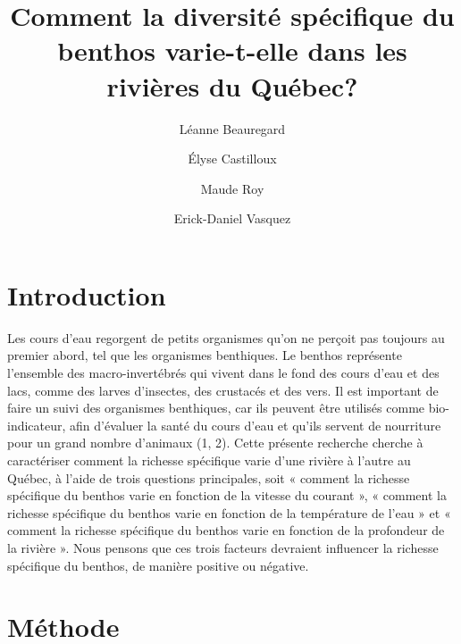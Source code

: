 \documentclass[9pt,twocolumn,twoside,final]{pnas-new}
\title{Comment la diversité spécifique du benthos varie-t-elle dans les
rivières du Québec?}
\author[a]{Léanne Beauregard}
\author[a]{Élyse Castilloux}
\author[a]{Maude Roy}
\author[a]{Erick-Daniel Vasquez}
\affil[a]{Univeristé de Sherbrooke, Département de Biologie}
\begin{document}
\verticaladjustment{-2pt}



\maketitle
\thispagestyle{firststyle}


\acknow{}

\section{Introduction}\label{introduction}

Les cours d'eau regorgent de petits organismes qu'on ne perçoit pas
toujours au premier abord, tel que les organismes benthiques. Le benthos
représente l'ensemble des macro-invertébrés qui vivent dans le fond des
cours d'eau et des lacs, comme des larves d'insectes, des crustacés et
des vers. Il est important de faire un suivi des organismes benthiques,
car ils peuvent être utilisés comme bio-indicateur, afin d'évaluer la
santé du cours d'eau et qu'ils servent de nourriture pour un grand
nombre d'animaux (1, 2). Cette présente recherche cherche à caractériser
comment la richesse spécifique varie d'une rivière à l'autre au Québec,
à l'aide de trois questions principales, soit « comment la richesse
spécifique du benthos varie en fonction de la vitesse du courant », «
comment la richesse spécifique du benthos varie en fonction de la
température de l'eau » et « comment la richesse spécifique du benthos
varie en fonction de la profondeur de la rivière ». Nous pensons que ces
trois facteurs devraient influencer la richesse spécifique du benthos,
de manière positive ou négative.

\section{Méthode}\label{muxe9thode}
\end{document}
